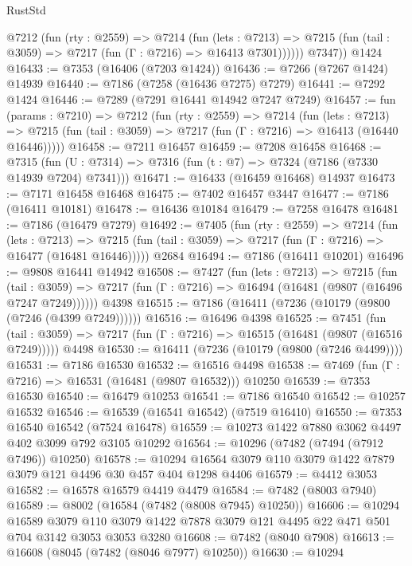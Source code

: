 \begin{lexlean}{RustStd}
\begin{coremodule}
{\begin{coremodule}
{{{{{{{{{{{{{{{{{{{{{{{{{{{{{{{{          @7212
            (fun (rty : @2559) =>
            @7214
              (fun (lets : @7213) =>
              @7215 (fun (tail : @3059) => @7217 (fun (Γ : @7216) => @16413 @7301))))))
        @7347))
    @1424
@16433 := @7353 (@16406 (@7203 @1424))
@16436 := @7266 (@7267 @1424) @14939
@16440 := @7186 (@7258 (@16436 @7275) @7279)
@16441 := @7292 @1424
@16446 := @7289 (@7291 @16441 @14942 @7247 @7249)
@16457 := fun (params : @7210) =>
  @7212
    (fun (rty : @2559) =>
    @7214
      (fun (lets : @7213) =>
      @7215 (fun (tail : @3059) => @7217 (fun (Γ : @7216) => @16413 (@16440 @16446)))))
@16458 := @7211 @16457
@16459 := @7208 @16458
@16468 := @7315
    (fun (U : @7314) => @7316 (fun (t : @7) => @7324 (@7186 (@7330 @14939 @7204) @7341)))
@16471 := @16433 (@16459 @16468) @14937
@16473 := @7171 @16458 @16468
@16475 := @7402 @16457 @3447
@16477 := @7186 (@16411 @10181)
@16478 := @16436 @10184
@16479 := @7258 @16478
@16481 := @7186 (@16479 @7279)
@16492 := @7405
    (fun (rty : @2559) =>
    @7214
      (fun (lets : @7213) =>
      @7215 (fun (tail : @3059) => @7217 (fun (Γ : @7216) => @16477 (@16481 @16446)))))
    @2684
@16494 := @7186 (@16411 @10201)
@16496 := @9808 @16441 @14942
@16508 := @7427
    (fun (lets : @7213) =>
    @7215
      (fun (tail : @3059) =>
      @7217 (fun (Γ : @7216) => @16494 (@16481 (@9807 (@16496 @7247 @7249))))))
    @4398
@16515 := @7186 (@16411 (@7236 (@10179 (@9800 (@7246 (@4399 @7249))))))
@16516 := @16496 @4398
@16525 := @7451
    (fun (tail : @3059) => @7217 (fun (Γ : @7216) => @16515 (@16481 (@9807 (@16516 @7249)))))
    @4498
@16530 := @16411 (@7236 (@10179 (@9800 (@7246 @4499))))
@16531 := @7186 @16530
@16532 := @16516 @4498
@16538 := @7469 (fun (Γ : @7216) => @16531 (@16481 (@9807 @16532))) @10250
@16539 := @7353 @16530
@16540 := @16479 @10253
@16541 := @7186 @16540
@16542 := @10257 @16532
@16546 := @16539 (@16541 @16542) (@7519 @16410)
@16550 := @7353 @16540 @16542 (@7524 @16478)
@16559 := @10273 @1422 @7880 @3062 @4497 @402 @3099 @792 @3105 @10292
@16564 := @10296 (@7482 (@7494 (@7912 @7496)) @10250)
@16578 := @10294 @16564 @3079 @110 @3079 @1422 @7879 @3079 @121 @4496 @30 @457 @404 @1298 @4406
@16579 := @4412 @3053
@16582 := @16578 @16579 @4419 @4479
@16584 := @7482 (@8003 @7940)
@16589 := @8002 (@16584 (@7482 (@8008 @7945) @10250))
@16606 := @10294
    @16589
    @3079
    @110
    @3079
    @1422
    @7878
    @3079
    @121
    @4495
    @22
    @471
    @501
    @704
    @3142
    @3053
    @3053
    @3280
@16608 := @7482 (@8040 @7908)
@16613 := @16608 (@8045 (@7482 (@8046 @7977) @10250))
@16630 := @10294
}}}}}}}}}}}}}}}}}}}}}}}}}}}}}}}}
\end{coremodule}}
\end{coremodule}
\end{lexlean}
